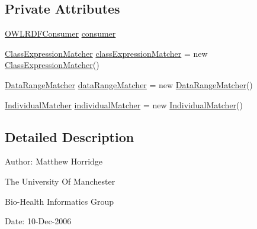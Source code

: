 \subsection*{Private Attributes}
\begin{DoxyCompactItemize}
\item 
\hyperlink{classorg_1_1coode_1_1owlapi_1_1rdfxml_1_1parser_1_1_o_w_l_r_d_f_consumer}{O\-W\-L\-R\-D\-F\-Consumer} \hyperlink{classorg_1_1coode_1_1owlapi_1_1rdfxml_1_1parser_1_1_abstract_triple_handler_a4ccf4d898ff01eb1cadfa04b23d54e9c}{consumer}
\item 
\hyperlink{classorg_1_1coode_1_1owlapi_1_1rdfxml_1_1parser_1_1_abstract_triple_handler_1_1_class_expression_matcher}{Class\-Expression\-Matcher} \hyperlink{classorg_1_1coode_1_1owlapi_1_1rdfxml_1_1parser_1_1_abstract_triple_handler_ab3cc3da781091190c5f23bc2f8bad154}{class\-Expression\-Matcher} = new \hyperlink{classorg_1_1coode_1_1owlapi_1_1rdfxml_1_1parser_1_1_abstract_triple_handler_1_1_class_expression_matcher}{Class\-Expression\-Matcher}()
\item 
\hyperlink{classorg_1_1coode_1_1owlapi_1_1rdfxml_1_1parser_1_1_abstract_triple_handler_1_1_data_range_matcher}{Data\-Range\-Matcher} \hyperlink{classorg_1_1coode_1_1owlapi_1_1rdfxml_1_1parser_1_1_abstract_triple_handler_ab2749b2d26d518587a3d9ac3746b3c61}{data\-Range\-Matcher} = new \hyperlink{classorg_1_1coode_1_1owlapi_1_1rdfxml_1_1parser_1_1_abstract_triple_handler_1_1_data_range_matcher}{Data\-Range\-Matcher}()
\item 
\hyperlink{classorg_1_1coode_1_1owlapi_1_1rdfxml_1_1parser_1_1_abstract_triple_handler_1_1_individual_matcher}{Individual\-Matcher} \hyperlink{classorg_1_1coode_1_1owlapi_1_1rdfxml_1_1parser_1_1_abstract_triple_handler_ae7d28f99eac8bbaaece0d83ba1ff3880}{individual\-Matcher} = new \hyperlink{classorg_1_1coode_1_1owlapi_1_1rdfxml_1_1parser_1_1_abstract_triple_handler_1_1_individual_matcher}{Individual\-Matcher}()
\end{DoxyCompactItemize}


\subsection{Detailed Description}
Author\-: Matthew Horridge\par
 The University Of Manchester\par
 Bio-\/\-Health Informatics Group\par
 Date\-: 10-\/\-Dec-\/2006\par
\par
 

